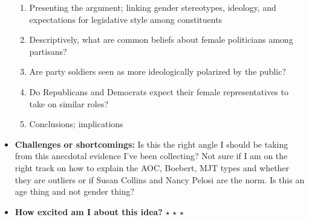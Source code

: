 \documentclass[12pt]{article}
\begin{document}
\begin{itemize}
\begin{enumerate}
            \item Presenting the argument; linking gender stereotypes, ideology, and expectations for legislative style among constituents
            \item Descriptively, what are common beliefs about female politicians among partisans?
            \item Are party soldiers seen as more ideologically polarized by the public?
            \item Do Republicans and Democrats expect their female representatives to take on similar roles?
            \item Conclusions; implications
        \end{enumerate}
        \item \textbf{Challenges or shortcomings:} Is this the right angle I should be taking from this anecdotal evidence I've been collecting? Not sure if I am on the right track on how to explain the AOC, Boebert, MJT types and whether they are outliers or if Susan Collins and Nancy Pelosi are the norm. Is this an age thing and not gender thing?
        \item \textbf{How excited am I about this idea?} $\star$ $\star$ $\star$
    \end{itemize}
\end{document}
